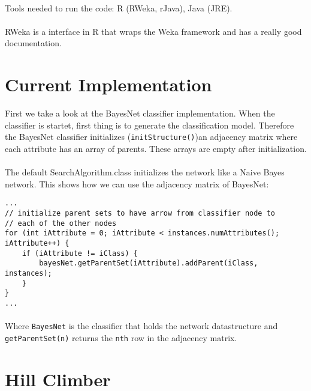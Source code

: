 \documentclass[paper=a4, fontsize=11pt]{scrartcl} %
\numberwithin{equation}{section} %
\numberwithin{figure}{section} %
\numberwithin{table}{section} %
\begin{document}
\paragraph{} Tools needed to run the code: R (RWeka, rJava), Java (JRE). 

\paragraph{} RWeka is a interface in R that wraps the Weka framework and has a really good documentation.

%
%
\section{Current Implementation}

First we take a look at the BayesNet classifier implementation. When the classifier is startet, first thing is to generate the classification model. Therefore the BayesNet classifier initializes (\texttt{initStructure()})an adjacency matrix where each attribute has an array of parents. These arrays are empty after initialization.

\paragraph{} The default SearchAlgorithm.class initializes the network like a Naive Bayes network. This shows how we can use the adjacency matrix of BayesNet:

\begin{lstlisting}
...
// initialize parent sets to have arrow from classifier node to
// each of the other nodes
for (int iAttribute = 0; iAttribute < instances.numAttributes(); iAttribute++) {
    if (iAttribute != iClass) {
        bayesNet.getParentSet(iAttribute).addParent(iClass, instances);
    }
}
...
\end{lstlisting}

\paragraph{} Where \texttt{BayesNet} is the classifier that holds the network datastructure and \texttt{getParentSet(n)} returns the \texttt{nth} row in the adjacency matrix.

%
%
%
\section{Hill Climber}
\end{document}

